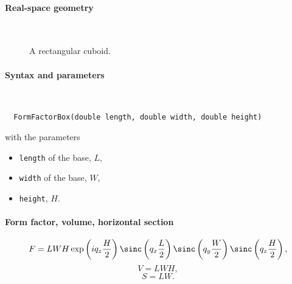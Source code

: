  \label{SBox}

\paragraph{Real-space geometry}\strut\\

\begin{figure}[H]
\hfill
{}
\hfill
{}
\hfill
{}
\hfill
\caption{A rectangular cuboid.}
\end{figure}

\FloatBarrier

\paragraph{Syntax and parameters}\strut\\[-2ex plus .2ex minus .2ex]
\begin{lstlisting}
  FormFactorBox(double length, double width, double height)
\end{lstlisting}
with the parameters
\begin{itemize}
\item \texttt{length} of the base, $L$,
\item \texttt{width} of the base, $W$,
\item \texttt{height}, $H$.
\end{itemize}

\paragraph{Form factor, volume, horizontal section}

\begin{equation*}
F= L W H\exp\left(i q_z \frac{H}{2}\right) \sinc\left(q_x \frac{L}{2}\right)
\sinc\left(q_y \frac{W}{2}\right) \sinc\left(q_z \frac{H}{2}\right),
\end{equation*}
\begin{equation*}
  V= LWH,
\end{equation*}
\begin{equation*}
  S = LW.
\end{equation*}

